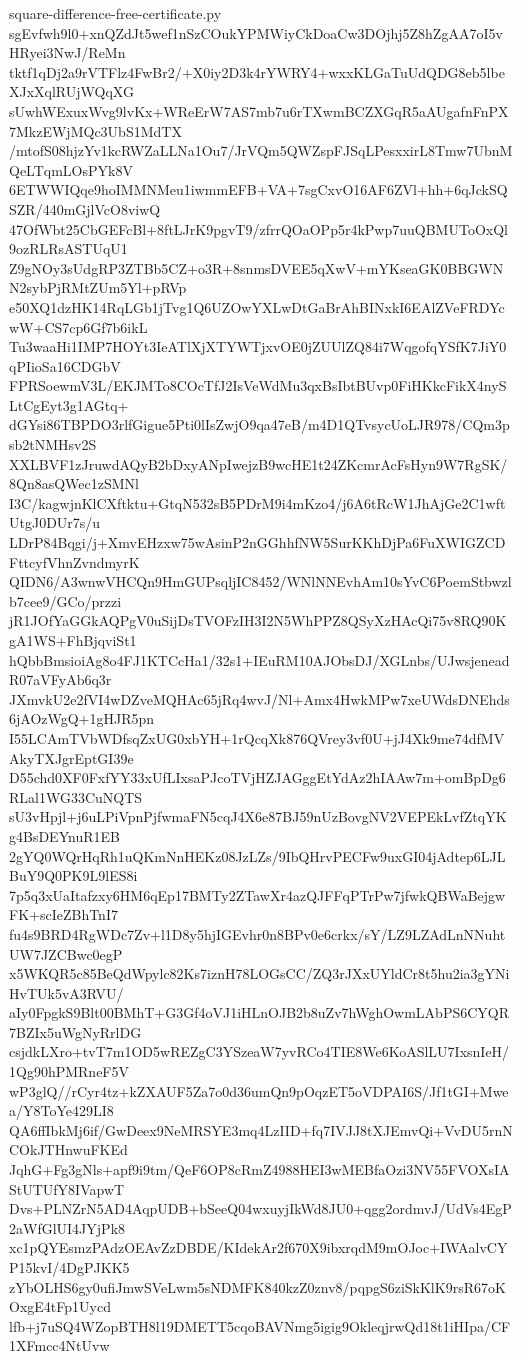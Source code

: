 \documentclass[11pt]{article}
\theoremstyle{definition}
\theoremstyle{remark}
\begin{document}
\begin{filecontents*}[overwrite]{square-difference-free-certificate.py}
sgEvfwh9l0+xnQZdJt5wef1nSzCOukYPMWiyCkDoaCw3DOjhj5Z8hZgAA7oI5vHRyei3NwJ/ReMn
tktf1qDj2a9rVTFlz4FwBr2/+X0iy2D3k4rYWRY4+wxxKLGaTuUdQDG8eb5lbeXJxXqlRUjWQqXG
sUwhWExuxWvg9lvKx+WReErW7AS7mb7u6rTXwmBCZXGqR5aAUgafnFnPX7MkzEWjMQc3UbS1MdTX
/mtofS08hjzYv1kcRWZaLLNa1Ou7/JrVQm5QWZspFJSqLPesxxirL8Tmw7UbnMQeLTqmLOsPYk8V
6ETWWIQqe9hoIMMNMeu1iwmmEFB+VA+7sgCxvO16AF6ZVl+hh+6qJckSQSZR/440mGjlVcO8viwQ
47OfWbt25CbGEFcBl+8ftLJrK9pgvT9/zfrrQOaOPp5r4kPwp7uuQBMUToOxQl9ozRLRsASTUqU1
Z9gNOy3sUdgRP3ZTBb5CZ+o3R+8snmsDVEE5qXwV+mYKseaGK0BBGWNN2sybPjRMtZUm5Yl+pRVp
e50XQ1dzHK14RqLGb1jTvg1Q6UZOwYXLwDtGaBrAhBINxkI6EAlZVeFRDYcwW+CS7cp6Gf7b6ikL
Tu3waaHi1IMP7HOYt3IeATlXjXTYWTjxvOE0jZUUlZQ84i7WqgofqYSfK7JiY0qPIioSa16CDGbV
FPRSoewmV3L/EKJMTo8COcTfJ2IsVeWdMu3qxBsIbtBUvp0FiHKkcFikX4nySLtCgEyt3g1AGtq+
dGYsi86TBPDO3rlfGigue5Pti0lIsZwjO9qa47eB/m4D1QTvsycUoLJR978/CQm3psb2tNMHsv2S
XXLBVF1zJruwdAQyB2bDxyANpIwejzB9wcHE1t24ZKcmrAcFsHyn9W7RgSK/8Qn8asQWec1zSMNl
I3C/kagwjnKlCXftktu+GtqN532sB5PDrM9i4mKzo4/j6A6tRcW1JhAjGe2C1wftUtgJ0DUr7s/u
LDrP84Bqgi/j+XmvEHzxw75wAsinP2nGGhhfNW5SurKKhDjPa6FuXWIGZCDFttcyfVhnZvndmyrK
QIDN6/A3wnwVHCQn9HmGUPsqljIC8452/WNlNNEvhAm10sYvC6PoemStbwzlb7cee9/GCo/przzi
jR1JOfYaGGkAQPgV0uSijDsTVOFzIH3I2N5WhPPZ8QSyXzHAcQi75v8RQ90KgA1WS+FhBjqviSt1
hQbbBmsioiAg8o4FJ1KTCcHa1/32s1+IEuRM10AJObsDJ/XGLnbs/UJwsjeneadR07aVFyAb6q3r
JXmvkU2e2fVI4wDZveMQHAc65jRq4wvJ/Nl+Amx4HwkMPw7xeUWdsDNEhds6jAOzWgQ+1gHJR5pn
I55LCAmTVbWDfsqZxUG0xbYH+1rQcqXk876QVrey3vf0U+jJ4Xk9me74dfMVAkyTXJgrEptGI39e
D55chd0XF0FxfYY33xUfLIxsaPJcoTVjHZJAGggEtYdAz2hIAAw7m+omBpDg6RLal1WG33CuNQTS
sU3vHpjl+j6uLPiVpnPjfwmaFN5cqJ4X6e87BJ59nUzBovgNV2VEPEkLvfZtqYKg4BsDEYnuR1EB
2gYQ0WQrHqRh1uQKmNnHEKz08JzLZs/9IbQHrvPECFw9uxGI04jAdtep6LJLBuY9Q0PK9L9lES8i
7p5q3xUaItafzxy6HM6qEp17BMTy2ZTawXr4azQJFFqPTrPw7jfwkQBWaBejgwFK+scIeZBhTnI7
fu4s9BRD4RgWDc7Zv+l1D8y5hjIGEvhr0n8BPv0e6crkx/sY/LZ9LZAdLnNNuhtUW7JZCBwc0egP
x5WKQR5c85BeQdWpylc82Ks7iznH78LOGsCC/ZQ3rJXxUYldCr8t5hu2ia3gYNiHvTUk5vA3RVU/
aIy0FpgkS9Blt00BMhT+G3Gf4oVJ1iHLnOJB2b8uZv7hWghOwmLAbPS6CYQR7BZIx5uWgNyRrlDG
csjdkLXro+tvT7m1OD5wREZgC3YSzeaW7yvRCo4TIE8We6KoASlLU7IxsnIeH/1Qg90hPMRneF5V
wP3glQ//rCyr4tz+kZXAUF5Za7o0d36umQn9pOqzET5oVDPAI6S/Jf1tGI+Mwea/Y8ToYe429LI8
QA6ffIbkMj6if/GwDeex9NeMRSYE3mq4LzIID+fq7IVJJ8tXJEmvQi+VvDU5rnNCOkJTHnwuFKEd
JqhG+Fg3gNls+apf9i9tm/QeF6OP8cRmZ4988HEI3wMEBfaOzi3NV55FVOXsIAStUTUfY8IVapwT
Dvs+PLNZrN5AD4AqpUDB+bSeeQ04wxuyjIkWd8JU0+qgg2ordmvJ/UdVs4EgP2aWfGlUI4JYjPk8
xc1pQYEsmzPAdzOEAvZzDBDE/KIdekAr2f670X9ibxrqdM9mOJoc+IWAalvCYP15kvI/4DgPJKK5
zYbOLHS6gy0ufiJmwSVeLwm5sNDMFK840kzZ0znv8/pqpgS6ziSkKlK9rsR67oKOxgE4tFp1Uycd
lfb+j7uSQ4WZopBTH8l19DMETT5cqoBAVNmg5igig9OkleqjrwQd18t1iHIpa/CF1XFmcc4NtUvw

\end{filecontents*}
\end{document}
